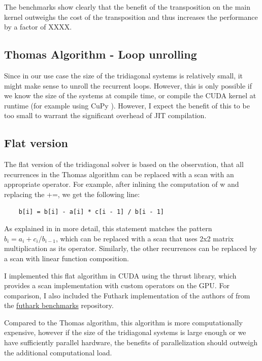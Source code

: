 \documentclass[a4paper,oneside]{memoir}
\begin{document}
The benchmarks show clearly that the benefit of the transposition on the main kernel outweighs the cost of the transposition and thus increases the performance by a factor of XXXX.

\subsection{Thomas Algorithm - Loop unrolling}
Since in our use case the size of the tridiagonal systems is relatively small, it might make sense to unroll the recurrent loops. However, this is only possible if we know the size of the systems at compile time, or compile the CUDA kernel at runtime (for example using CuPy \cite{cupylearningsys2017}). 
However, I expect the benefit of this to be too small to warrant the significant overhead of JIT compilation.

\subsection{Flat version}
The flat version of the tridiagonal solver is based on the observation, 
that all recurrences in the Thomas algorithm can be replaced with a scan with an appropriate operator. 
For example, after inlining the computation of w and replacing the +=, we get the following line: 
\begin{verbatim}
    b[i] = b[i] - a[i] * c[i - 1] / b[i - 1] 
\end{verbatim}
As explained in \cite{andreetta2016finpar} in more detail, this statement matches the pattern $b_i = a_i + c_i / b_{i-1}$, which can be replaced with a scan that uses 2x2 matrix multiplication as its operator.
Similarly, the other recurrences can be replaced by a scan with linear function composition.

I implemented this flat algorithm in CUDA using the thrust library, which provides a scan implementation with custom operators on the GPU.
For comparison, I also included the Futhark implementation of the authors of \cite{andreetta2016finpar} from the 
\href{https://github.com/diku-dk/futhark-benchmarks/blob/bf5112d0841866dc7370586f2e2a7b48467d2d97/finpar/LocVolCalib.fut}{futhark benchmarks}
repository.

Compared to the Thomas algorithm, this algorithm is more computationally expensive, however if the size of the tridiagonal systems is large enough or we have sufficiently parallel hardware, the benefits of parallelization should outweigh the additional computational load. 
\end{document}
